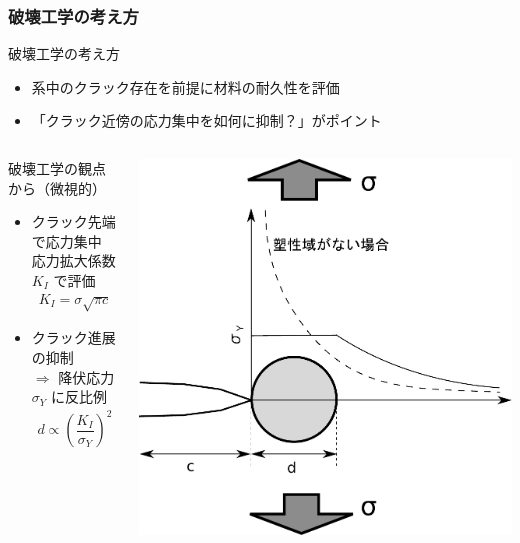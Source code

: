 \documentclass[12pt, dvipdfmx]{beamer}
\begin{document}
\begin{frame}
	\frametitle{破壊工学の考え方}
		\begin{exampleblock}{破壊工学の考え方}
			\begin{itemize}
				\item 系中のクラック存在を前提に材料の耐久性を評価
				\item \alert{「クラック近傍の応力集中を如何に抑制？」}がポイント
			\end{itemize}
		\end{exampleblock}
		\begin{columns}[totalwidth=1\textwidth]
				\begin{alertblock}{破壊工学の観点から（微視的）}
					\begin{itemize}
						\item クラック先端で応力集中\\ \alert{応力拡大係数 $K_I$ で評価}
							\footnotesize
							\begin{align*}
							K_{I} = \sigma \sqrt{\pi c}
							\end{align*}
							\normalsize
						\item クラック進展の抑制 \\
							$\Rightarrow$ 
							降伏応力 $\sigma_Y$ に反比例
							\footnotesize
							\begin{align*}
							d \propto \left( \dfrac{K_I}{\sigma_Y} \right)^2
							\end{align*}
							\normalsize
					\end{itemize}
				\end{alertblock}
			\includegraphics[width=.9\textwidth]{Crack_Yield.pdf}
		\end{columns}
\end{frame}
\end{document}
